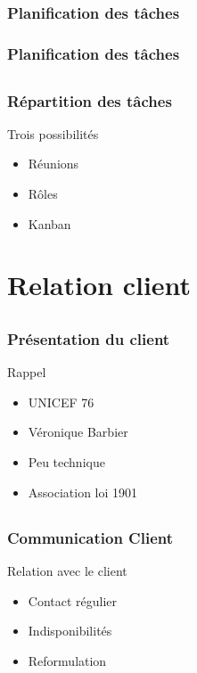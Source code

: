 \documentclass[compress,xcolor=dvipsnames]{beamer}
\begin{document}
\subsection{}
\begin{frame}
\frametitle{Planification des tâches}
\end{frame}

\begin{frame}
\frametitle{Planification des tâches}
\end{frame}


\subsection{}
\begin{frame}
\frametitle{Répartition des tâches}
\begin{block}{Trois possibilités}
\begin{itemize}
	\item Réunions
	\item Rôles
	\item Kanban
\end{itemize}
\end{block}
\end{frame}



\section{Relation client}
\subsection{}
\begin{frame}
\frametitle{Présentation du client}
\begin{block}{Rappel}
\begin{itemize}
	\item UNICEF 76
	\item Véronique Barbier
	\item Peu technique
	\item Association loi 1901
\end{itemize}
\end{block}
\end{frame}


\subsection{}
\begin{frame}
\frametitle{Communication Client}
\begin{block}{Relation avec le client}
\begin{itemize}
	\item Contact régulier
	\item Indisponibilités
	\item Reformulation
\end{itemize}
\end{block}
\end{frame}
\end{document}
